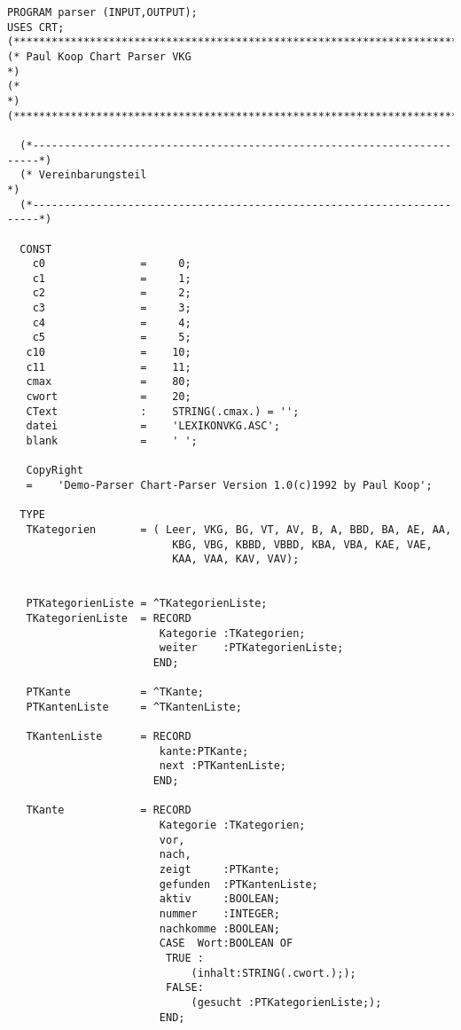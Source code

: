 \documentclass[12pt]{article}
\begin{document}
\begin{verbatim}
PROGRAM parser (INPUT,OUTPUT);
USES CRT;
(***************************************************************************)
(* Paul Koop Chart Parser VKG                                              *)
(*                                                                         *)
(***************************************************************************)

  (*-----------------------------------------------------------------------*)
  (* Vereinbarungsteil                                                     *)
  (*-----------------------------------------------------------------------*)

  CONST
    c0               =     0;
    c1               =     1;
    c2               =     2;
    c3               =     3;
    c4               =     4;
    c5               =     5;
   c10               =    10;
   c11               =    11;
   cmax              =    80;
   cwort             =    20;
   CText             :    STRING(.cmax.) = '';
   datei             =    'LEXIKONVKG.ASC';
   blank             =    ' ';

   CopyRight
   =    'Demo-Parser Chart-Parser Version 1.0(c)1992 by Paul Koop';

  TYPE
   TKategorien       = ( Leer, VKG, BG, VT, AV, B, A, BBD, BA, AE, AA,
                          KBG, VBG, KBBD, VBBD, KBA, VBA, KAE, VAE,
                          KAA, VAA, KAV, VAV);


   PTKategorienListe = ^TKategorienListe;
   TKategorienListe  = RECORD
                        Kategorie :TKategorien;
                        weiter    :PTKategorienListe;
                       END;

   PTKante           = ^TKante;
   PTKantenListe     = ^TKantenListe;

   TKantenListe      = RECORD
                        kante:PTKante;
                        next :PTKantenListe;
                       END;

   TKante            = RECORD
                        Kategorie :TKategorien;
                        vor,
                        nach,
                        zeigt     :PTKante;
                        gefunden  :PTKantenListe;
                        aktiv     :BOOLEAN;
                        nummer    :INTEGER;
                        nachkomme :BOOLEAN;
                        CASE  Wort:BOOLEAN OF
                         TRUE :
                             (inhalt:STRING(.cwort.););
                         FALSE:
                             (gesucht :PTKategorienListe;);
                        END;



\end{verbatim}
\end{document}
